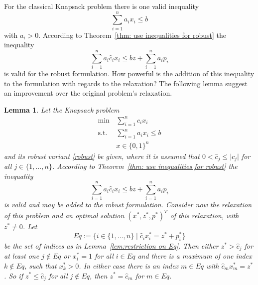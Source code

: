 \documentclass[titlepage, a4paper]{amsbook}
\theoremstyle{plain}
\newtheorem{lem}[thm]{Lemma}
\theoremstyle{break}
\theoremstyle{definition}
\theoremstyle{remark}
\numberwithin{equation}{thm}
\begin{document}
For the classical Knapsack problem there is one valid inequality \[\sum_{i=1}^n a_i x_i \leq b\]
with $a_i > 0$. According to Theorem~\ref{thm: use inequalities for robust} the inequality
\[\sum_{i=1}^n a_i \hat{c}_i x_i \leq bz + \sum_{i=1}^n a_i p_i\]
is valid for the robust formulation. How powerful is the addition of this inequality to the formulation with regards to the relaxation? The following lemma suggest an improvement over the original problem's relaxation.
\begin{lem}\label{lem:additional knapsack ineq}
Let the Knapsack problem 
\begin{align*}
    \min\, &\sum_{i=1}^n c_ix_i \\
    \text{s.t. } &\sum_{i=1}^n a_ix_i \leq b \\
    &x \in \{0,1\}^n
\end{align*}
and its robust variant \eqref{robust} be given, where it is assumed that $0 < \hat{c}_j \leq \vert c_j \vert$ for all $j \in \{1, \ldots, n\}$. According to
Theorem~\ref{thm: use inequalities for robust} the inequality 
\[\sum_{i=1}^n a_i \hat{c}_i x_i \leq bz + \sum_{i=1}^n a_i p_i\]
is valid and may be added to the robust formulation. Consider now the relaxation of this problem and an optimal solution $(x^*,z^*,p^*)^T$ of this relaxation, with $z^* \neq 0$. Let 
\[Eq:=\{i \in \{1, \ldots, n\} \mid \hat{c}_ix^*_i=z^*+p^*_i\}\]
be the set of indices as in Lemma~\ref{lem:restriction on Eq}.
Then either $z^* > \hat{c}_j$ for at least one $j \notin Eq$ or 
$x^*_i=1$ for all $i \in Eq$ and there is a maximum of one index $k \notin Eq$, such that $x^*_k > 0$. In either case there is an index $m \in Eq$ with $\hat{c}_m x^*_m = z^*$. So if $z^* \leq \hat{c}_j$ for all $j \notin Eq$, then $z^*=\hat{c}_m$ for $m \in Eq$.
\end{lem}
\end{document}
